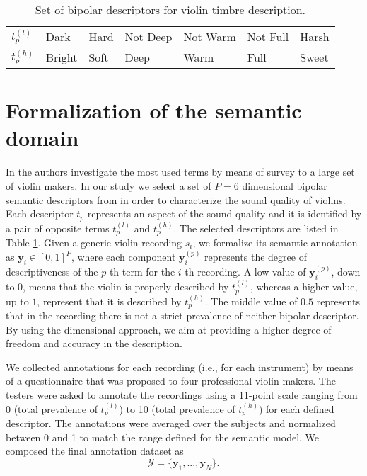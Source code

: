 

\begin{table}[tb]
\caption{Set of bipolar descriptors for violin timbre description.}
\label{tab:Violin:descriptors}
\centering
\bgroup
\def\arraystretch{1.5}
\begin{tabular}{||l||l|l|l|l|l|l||}
\hline
\hline
$t_p^{(l)}$ & Dark & Hard & Not Deep & Not Warm & Not Full & Harsh \\
 $t_p^{(h)}$ & Bright & Soft & Deep & Warm & Full & Sweet\\
\hline
\hline
\end{tabular}
\egroup
\end{table}

\section{Formalization of the semantic domain}\label{sec:Violin:HLFs}
In \cite{Zanoni2014} the authors investigate the most used terms by means of survey to a large set of violin makers. In our study we select a set of $P=6$ dimensional bipolar semantic descriptors from \cite{Zanoni2014} in order to characterize the sound quality of violins. Each descriptor $t_p$ represents an aspect of the sound quality and it is identified by a pair of opposite terms $t_p^{(l)}$ and $t_p^{(h)}$. The selected descriptors are listed in Table \ref{tab:Violin:descriptors}. Given a generic violin recording $s_i$, we formalize its semantic annotation as $\mathbf{y}_i\in [0,1]^P$, where each component $\mathbf{y}_i^{(p)}$ represents the degree of descriptiveness of the $p$-th term for the $i$-th recording.  A low value of  $\mathbf{y}_i^{(p)}$, down to $0$, means that the violin is properly described by $t_p^{(l)}$, whereas a higher value, up to $1$, represent that it is described by $t_p^{(h)}$. The middle value of $0.5$ represents that in the recording there is not a strict prevalence of neither bipolar descriptor.  By using the dimensional approach, we aim at providing a higher degree of freedom and accuracy in the description. 

We collected annotations for each recording (i.e., for each instrument) by means of a questionnaire that was proposed to four professional violin makers. The testers were asked to annotate the recordings using a 11-point scale ranging from 0 (total prevalence of $t_p^{(l)}$) to 10 (total prevalence of $t_p^{(h)}$) for each defined  descriptor. The annotations were averaged over the subjects and normalized between 0 and 1 to match the range defined for the semantic model. We composed the final annotation dataset as
\begin{equation}
\mathcal{Y}=\{\mathbf{y}_1,..., \mathbf{y}_N  \}.
\end{equation}


